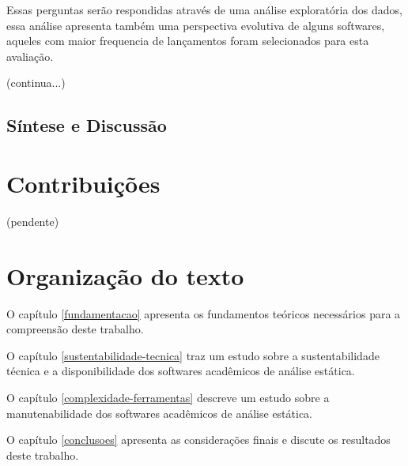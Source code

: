 Essas perguntas serão respondidas através de uma análise exploratória dos
dados, essa análise apresenta também uma perspectiva evolutiva de alguns
softwares, aqueles com maior frequencia de lançamentos foram selecionados para
esta avaliação.

(continua...)

\subsection{Síntese e Discussão}


\section{Contribuições}

(pendente)

\section{Organização do texto}

O capítulo \ref{fundamentacao} apresenta os fundamentos teóricos necessários
para a compreensão deste trabalho.

O capítulo \ref{sustentabilidade-tecnica} traz um estudo sobre a
sustentabilidade técnica e a disponibilidade dos softwares acadêmicos de
análise estática.

O capítulo \ref{complexidade-ferramentas} descreve um estudo sobre a
manutenabilidade dos softwares acadêmicos de análise estática.

O capítulo \ref{conclusoes} apresenta as considerações finais e discute os
resultados deste trabalho.
